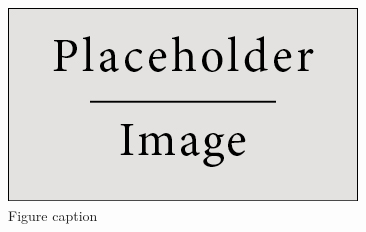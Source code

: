 \documentclass[draft,grl]{AGUTeX}
\begin{document}
\begin{article}


\end{article}


%
%
%
%
%
%


\newpage

\begin{figure}
\includegraphics[width=0.4\linewidth]{placeholder.jpg}
\caption{Figure caption}\label{placeholder}
\end{figure}
\end{document}
